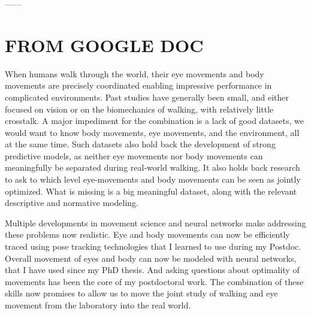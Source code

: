 ------

\section{ FROM GOOGLE DOC}

When humans walk through the world, their eye movements and body movements are precisely coordinated enabling impressive performance in complicated environments. Past studies have generally been small, and either focused on vision or on the biomechanics of walking, with relatively little crosstalk. A major impediment for the combination is a lack of good datasets, we would want to know body movements, eye movements, and the environment, all at the same time. Such datasets also hold back the development of strong predictive models, as neither eye movements nor body movements can meaningfully be separated during real-world walking. It also holds back research to ask to which level eye-movements and body movements can be seen as jointly optimized. What is missing is a big meaningful dataset, along with the relevant descriptive and normative modeling.

Multiple developments in movement science and neural networks make addressing these problems now realistic. Eye and body movements can now be efficiently traced using pose tracking technologies that I learned to use during my Postdoc. Overall movement of eyes and body can now be modeled with neural networks, that I have used since my PhD thesis. And asking questions about optimality of movements has been the core of my postdoctoral work. The combination of these skills now promises to allow us to move the joint study of walking and eye movement from the laboratory into the real world.
